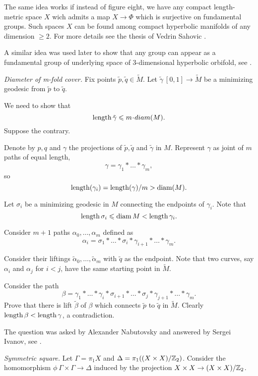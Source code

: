 The same idea works if instead of figure eight, we have any compact length-metric space $X$ wich admits a map $X\to\Phi$
which is surjective on fundamental groups.
Such spaces $X$ can be found among compact hyperbolic manifolds of any dimension $\ge 2$.
For more details see the thesis of Vedrin Sahovic \cite{sahovic}.

A similar idea was used later to show that any group can appear as a fundamental group of underlying space of 3-dimensional hyperbolic orbifold, see \cite{panov-petrunin-telescopic}.





\textit{Diameter of \textit{m}-fold cover.}
Fix points $\tilde p,\tilde q\in\tilde M$.
Let  
$\tilde\gamma\:[0,1]\to \tilde M$ be a minimizing geodesic from $\tilde p$ to $\tilde q$. 

We need to show that 
\[\length \tilde\gamma\le m\cdot diam(M).\]
Suppose the contrary.

Denote by $p,q$ and $\gamma$ the projections of $\tilde p,\tilde q$ and $\tilde \gamma$ in $M$. 
Represent $\gamma$
as joint of $m$ paths of equal length,
\[\gamma=\gamma_1{*}\dots{*}\gamma_m,\] 
so
\[\operatorname{\rm length}(\gamma_i)=\operatorname{\rm length}(\gamma)/m>\operatorname{\rm diam}(M).\] 

Let $\sigma_i$ be a minimizing geodesic in $M$ connecting the endpoints of $\gamma_i$. 
Note that 
\[\operatorname{\rm length}\sigma_i\leqslant \operatorname{\rm diam} M< \operatorname{\rm length}\gamma_i.\] 

Consider $m+1$ paths $\alpha_0,\dots,\alpha_m$ defined as 
\[\alpha_i=\sigma_1{*}\dots{*}\sigma_i{*}\gamma_{i+1}{*}\dots{*}\gamma_m.\]

Consider their liftings $\tilde\alpha_0,\dots,\tilde\alpha_m$ 
with $\tilde q$ as the endpoint.
Note that two curves, say $\alpha_i$ and $\alpha_j$ for $i<j$, 
have the same starting point in $\tilde M$.

Consider the path
\[\beta=\gamma_1{*}\dots{*}\gamma_i{*}\sigma_{i+1}{*}\dots{*}\sigma_j{*}\gamma_{j+1}{*}\dots{*}\gamma_m.\]
Prove that there is lift $\tilde\beta$ of $\beta$ 
which connects $\tilde p$ to $\tilde q$ in $\tilde M$.
Clearly $\operatorname{\rm length} \beta<\operatorname{\rm length} \gamma$, a contradiction.

The question was asked by Alexander  Nabutovsky
and answered by Sergei Ivanov, 
see \cite{ivanov}.



\textit{Symmetric square.}
Let $\Gamma=\pi_1 X$ and $\Delta=\pi_1((X\times X)/\mathbb{Z}_2)$.
Consider the homomorphism $\phi\:\Gamma\times \Gamma\to \Delta$
induced by the projection $X\times X\to (X\times X)/\mathbb{Z}_2$.

